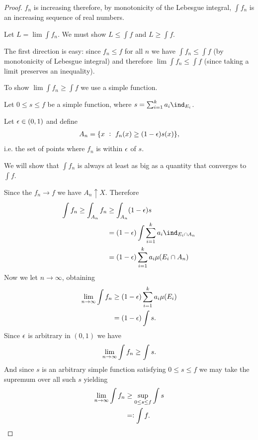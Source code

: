 \begin{proof}
  $f_n$ is increasing therefore, by monotonicity of the Lebesgue integral, $\int f_n$ is an increasing sequence
  of real numbers.

  Let $L = \lim \int f_n$. We must show $L \leq \int f$ and $L \geq \int f$.

  The first direction is easy: since $f_n \leq f$ for all $n$ we have $\int f_n \leq \int f$ (by monotonicity
  of Lebesgue integral) and therefore $\lim \int f_n \leq \int f$ (since taking a limit preserves an
  inequality).

  To show $\lim \int f_n \geq \int f$ we use a simple function.

  Let $0 \leq s \leq f$ be a simple function, where $s = \sum_{i=1}^k a_i\ind_{E_i}$.

  Let $\epsilon \in (0, 1)$ and define
  \begin{align*}
    A_n = \{x ~:~ f_n(x) \geq (1 - \epsilon)s(x)\},
  \end{align*}
  i.e. the set of points where $f_n$ is within $\epsilon$ of $s$.

  We will show that $\int f_n$ is always at least as big as a quantity that converges to $\int f$.

  Since the $f_n \to f$ we have $A_n \uparrow X$. Therefore
  \begin{align*}
    \int f_n
    \geq \int_{A_n} f_n
    &\geq \int_{A_n} (1 - \eps)s \\
    &=    (1 - \eps)\int \sum_{i=1}^k a_i\ind_{E_i \cap A_n} \\
    &=    (1 - \eps)\sum_{i=1}^k a_i\mu(E_i \cap A_n) \\
  \end{align*}
  Now we let $n \to \infty$, obtaining
  \begin{align*}
    \limn \int f_n
    &\geq (1 - \eps)\sum_{i=1}^k a_i\mu(E_i) \\
    &= (1 - \eps)\int s.
  \end{align*}
  Since $\epsilon$ is arbitrary in $(0, 1)$ we have
  \begin{align*}
    \limn \int f_n \geq \int s.
  \end{align*}
  And since $s$ is an arbitrary simple function satisfying $0 \leq s \leq f$ we may take the supremum over all
  such $s$ yielding
  \begin{align*}
    \limn \int f_n
    &\geq \sup_{0 \leq s \leq f} \int s\\
    &=:    \int f.
  \end{align*}
\end{proof}

